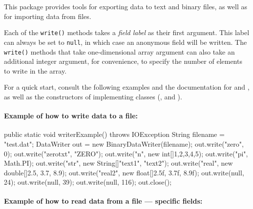 
This package provides tools for exporting data to text and binary files, as
well as for importing data from files.

Each of the \texttt{write()} methods takes a \emph{field label} as their first
 argument. This label can always be set to \texttt{null}, in which case an
 anonymous field will be written.
The \texttt{write()} methods that take one-dimensional array argument can also
 take an additional integer argument, for convenience, to specify the number
 of elements  to write in the array.

For a quick start, consult the following examples and the documentation for
 and 
, as well as the
constructors of implementing classes
 (,
  and
 ).

\paragraph*{Example of how to write data to a file:}

\begin{vcode}

public static void writerExample() throws IOException {
   String filename = "test.dat";
   DataWriter out = new BinaryDataWriter(filename);
   out.write("zero", 0);
   out.write("zerotxt", "ZERO");
   out.write("n", new int[]{1,2,3,4,5});
   out.write("pi", Math.PI);
   out.write("str", new String[]{"text1", "text2"});
   out.write("real", new double[]{2.5, 3.7, 8.9});
   out.write("real2", new float[]{2.5f, 3.7f, 8.9f});
   out.write(null, 24);
   out.write(null, 39);
   out.write(null, 116);
   out.close();
}
\end{vcode}


\paragraph*{Example of how to read data from a file --- specific fields:}

